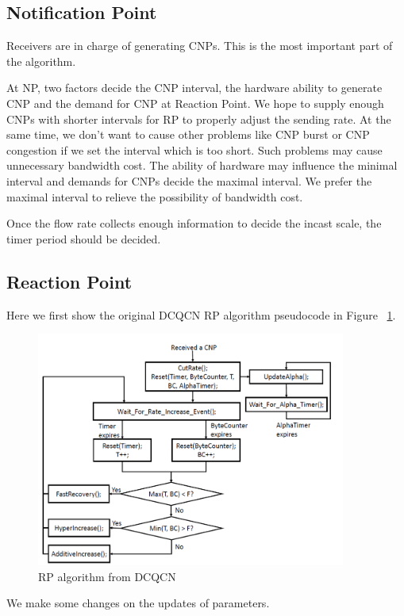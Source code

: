 \documentclass[12pt,a4paper]{article}
\begin{document}
\subsection{Notification Point}

Receivers are in charge of generating CNPs.
This is the most important part of the algorithm.

At NP, two factors decide the CNP interval, the hardware ability to generate CNP and the demand for CNP at Reaction Point.
We hope to supply enough CNPs with shorter intervals for RP to properly adjust the sending rate.
At the same time, we don't want to cause other problems like CNP burst or CNP congestion if we set the interval which is too short.
Such problems may cause unnecessary bandwidth cost.
The ability of hardware may influence the minimal interval and demands for CNPs decide the maximal interval.
We prefer the maximal interval to relieve the possibility of bandwidth cost.

Once the flow rate collects enough information to decide the incast scale, the timer period should be decided.

\subsection{Reaction Point}

Here we first show the original DCQCN RP algorithm pseudocode in Figure ~\ref{fig:RPalg}.
\begin{figure}[ht]
	\begin{center}
		\includegraphics[width=4in]{RPalg}
		\caption{RP algorithm from DCQCN}
		\label{fig:RPalg}
	\end{center}
\end{figure}

We make some changes on the updates of parameters.
\end{document}
